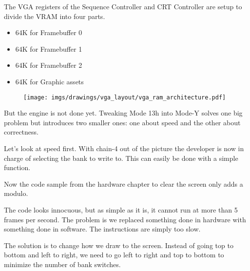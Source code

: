 \documentclass[book.tex]{subfiles}
\begin{document}
 \par
 The VGA registers of the Sequence Controller and CRT Controller are setup to divide the VRAM into four parts.
 \begin{itemize}\label{SetupPages}
 \item 64K for Framebuffer 0
 \item 64K for Framebuffer 1
 \item 64K for Framebuffer 2
 \item 64K for Graphic assets
\end{itemize}
\par
\begin{figure}[H]
\centering
 \texttt{[image: imgs/drawings/vga\_layout/vga\_ram\_architecture.pdf]}
 \end{figure}
\par
But the engine is not done yet. Tweaking Mode 13h into Mode-Y solves one big problem but introduces two smaller ones: one about speed and the other about correctness.\\
\par
Let's look at speed first. With chain-4 out of the picture the developer is now in charge of selecting the bank to write to. This can easily be done with a simple function.\\
\par
 \par
 \begin{minipage}{\textwidth}

\end{minipage}
 \par

Now the code sample from the hardware chapter to clear the screen only adds a modulo.\\
\par
\par
\begin{minipage}{\textwidth}

\end{minipage}
\par
The code looks innocuous, but as simple as it is, it cannot run at more than 5 frames per second. The problem is we replaced something done in hardware with something done in software. The  instructions are simply too slow.\\
\par
The solution is to change how we draw to the screen. Instead of going top to bottom and left to right, we need to go left to right and top to bottom to minimize the number of bank switches.\\
\par
\begin{minipage}{\textwidth}

\end{minipage}
\end{document}
